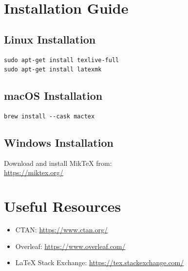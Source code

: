 \chapter{Installation Guide}

\section{Linux Installation}
\begin{verbatim}
sudo apt-get install texlive-full
sudo apt-get install latexmk
\end{verbatim}

\section{macOS Installation}
\begin{verbatim}
brew install --cask mactex
\end{verbatim}

\section{Windows Installation}
Download and install MikTeX from:\\
\url{https://miktex.org/}

\chapter{Useful Resources}
\begin{itemize}
    \item CTAN: \url{https://www.ctan.org/}
    \item Overleaf: \url{https://www.overleaf.com/}
    \item LaTeX Stack Exchange: \url{https://tex.stackexchange.com/}
\end{itemize}